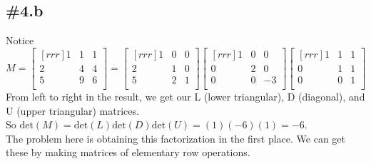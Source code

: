 \documentclass{report}
\theoremstyle{plain}
\theoremstyle{definition}
\theoremstyle{plain}
\begin{document}
\subsection{\#4.b}
Notice
\[ M = \begin{bmatrix}[rrr]1&1&1\\2&4&4\\5&9&6\\\end{bmatrix}=\begin{bmatrix}[rrr]1&0&0\\2&1&0\\5&2&1\\\end{bmatrix}\begin{bmatrix}[rrr]1&0&0\\0&2&0\\0&0&-3\\\end{bmatrix}\begin{bmatrix}[rrr]1&1&1\\0&1&1\\0&0&1\\\end{bmatrix} \]
From left to right in the result, we get our L (lower triangular), D (diagonal), and U (upper triangular) matrices.\\
So $\mathrm{det}(M)=\mathrm{det}(L)\mathrm{det}(D)\mathrm{det}(U) = (1)(-6)(1) = -6$.\\
The problem here is obtaining this factorization in the first place. We can get these by making matrices of elementary row operations.
\end{document}
